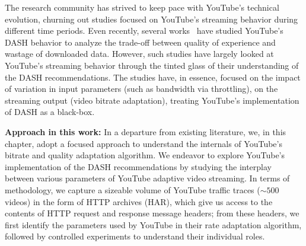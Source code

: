 \label{chap03s1:sec:introduction}


The research community has strived to keep pace with YouTube's technical evolution, churning out studies focused on YouTube's streaming behavior during different time periods.
Even recently, several works~\cite{sieber2015cost,seufert2015youtube,sieber2016sacrificing} have studied YouTube's DASH behavior to analyze the trade-off between quality of experience and wastage of downloaded data.
However, such studies have largely looked at YouTube's streaming behavior through the tinted glass of their understanding of the DASH recommendations.
The studies have, in essence, focused on the impact of variation in input parameters (such as bandwidth via throttling), on the streaming output (video bitrate adaptation), treating YouTube's implementation of DASH as a black-box.	

{\bf Approach in this work:} In a departure from existing literature, we, in this chapter, adopt a focused approach to understand the internals of YouTube's bitrate and quality adaptation algorithm.
We endeavor to explore YouTube's implementation of the DASH recommendations by studying the interplay between various parameters of YouTube adaptive video streaming.
In terms of methodology, we capture a sizeable volume of YouTube traffic traces ($\sim500$ videos) in the form of HTTP archives (HAR), which give us access to the contents of HTTP request and response message headers;
from these headers, we first identify the parameters used by YouTube in their rate adaptation algorithm, followed by controlled experiments to understand their individual roles.

